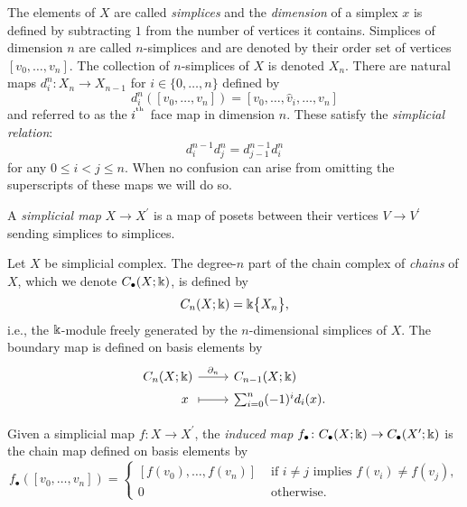 The elements of $X$ are called \textit{simplices} and the \textit{dimension} of a simplex $x$ is defined by subtracting $1$ from the number of vertices it contains.
Simplices of dimension $n$ are called $n$-simplices and are denoted by their order set of vertices $[v_0, \dots, v_n]$.
The collection of $n$-simplices of $X$ is denoted $X_n$.
There are natural maps $d_i^n \colon X_n \to X_{n-1}$ for $i \in \{0, \dots, n\}$ defined by
\begin{equation*}
d_i^n([v_0, \dots, v_n]) = [v_0, \dots, \widehat{v}_i, \dots, v_n]
\end{equation*}
and referred to as the $i^{^\mathrm{th}}$ face map in dimension $n$.
These satisfy the \textit{simplicial relation}:
\begin{equation} \label{e:simplicial relation}
d_i^{n-1} d^n_j = d_{j-1}^{n-1} d_i^n
\end{equation}
for any $0 \leq i < j \leq n$.
When no confusion can arise from omitting the superscripts of these maps we will do so.

A \textit{simplicial map} $X \to X^\prime$ is a map of posets between their vertices $V \to V^\prime$ sending simplices to simplices.

Let $X$ be simplicial complex.
The degree-$n$ part of the chain complex of \textit{chains} of $X$, which we denote $C_\bullet(X; \Bbbk)$, is defined by
\begin{equation*}
C_n(X; \Bbbk) = \Bbbk \big\{ X_n \big\},
\end{equation*}
i.e., the $\Bbbk$-module freely generated by the $n$-dimensional simplices of $X$.
The boundary map is defined on basis elements by
\begin{equation*}
\begin{tikzcd}[column sep=normal, row sep=tiny,row sep = 0ex
,/tikz/column 1/.append style={anchor=base east}
,/tikz/column 2/.append style={anchor=base west}
]
C_n(X; \k) \arrow[r, "\partial_n"] & C_{n-1}(X; \k) \\
x\ \arrow[r, |->] & \sum_{i=0}^{n} (-1)^i d_i (x).
\end{tikzcd}
\end{equation*}

Given a simplicial map $f \colon X \to X^\prime$, the \textit{induced map} $f_\bullet \colon C_\bullet(X; \Bbbk) \to C_\bullet(X^\prime; \Bbbk)$ is the chain map defined on basis elements by
\begin{equation*}
f_\bullet([v_0, \dots, v_n]) =
\begin{cases}
[f(v_0), \dots, f(v_n)] & \text{ if } i \neq j \text{ implies } f(v_i) \neq f(v_j), \\
0 & \text{ otherwise}.
\end{cases}
\end{equation*}

